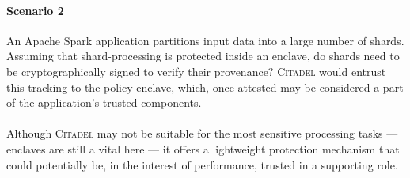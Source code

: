 \paragraph{Scenario 2} An Apache Spark application partitions input data into a large number of shards. Assuming that shard-processing is protected inside an enclave, do shards need to be cryptographically signed to verify their provenance? \textsc{Citadel} would entrust this tracking to the policy enclave, which, once attested may be considered a part of the application's trusted components.

\paragraph{} Although \textsc{Citadel} may not be suitable for the most sensitive processing tasks --- enclaves are still a vital here --- it offers a lightweight protection mechanism that could potentially be, in the interest of performance, trusted in a supporting role.
